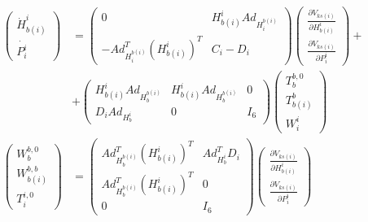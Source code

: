 \documentclass[a4paper,twoside, openright,12pt]{report}
\begin{document}
\begin{eqnarray}\label{EQ:internalimpedance}
\begin{aligned}
\begin{pmatrix}\dot{H}_{b(i)}^i \\ 
\dot{P_i^i} \end{pmatrix} &= \begin{pmatrix}
0 & H_{b(i)}^i Ad_{H_i^{b(i)}} \\
-Ad_{H_i^{b(i)}}^T (H_{b(i)}^i)^T & C_i - D_i
\end{pmatrix}
\begin{pmatrix}
\frac{\partial V_{ks(i)}}{\partial H_{b(i)}^i} \\ 
\frac{\partial V_{ks(i)}}{\partial P_{i}^i}
\end{pmatrix} + \\ &+
\begin{pmatrix}
H_{b(i)}^i Ad_{H_b^{b(i)}} & H_{b(i)}^i Ad_{H_b^{b(i)}} & 0 \\
D_i Ad_{H_b^i} & 0 & I_6
\end{pmatrix}
\begin{pmatrix}
T_b^{b,0} \\ T_{b(i)}^b \\ W_i^i
\end{pmatrix} \\
\begin{pmatrix}
W_b^{b,0} \\ W_{b(i)}^{b,b} \\ T_i^{i,0}
\end{pmatrix} &= 
\begin{pmatrix}
Ad_{H_b^{b(i)}}^T (H_{b(i)}^i)^T &  Ad_{H_b^i}^T D_i \\  Ad_{H_b^{b(i)}}^T (H_{b(i)}^i)^T & 0 \\
 0 & I_6
\end{pmatrix}
\begin{pmatrix}
\frac{\partial V_{ks(i)}}{\partial H_{b(i)}^i} \\ 
\frac{\partial V_{ks(i)}}{\partial P_{i}^i}
\end{pmatrix}
\end{aligned}
\end{eqnarray} 
\end{document}
